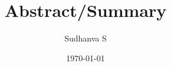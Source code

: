 \documentclass{article}
\title{Abstract/Summary}
\author{Sudhanva S}
\date{\today}
\begin{document}
\maketitle
\thispagestyle{fancy}

\begin{abstract}
\lipsum[1]
\end{abstract}
\end{document}
